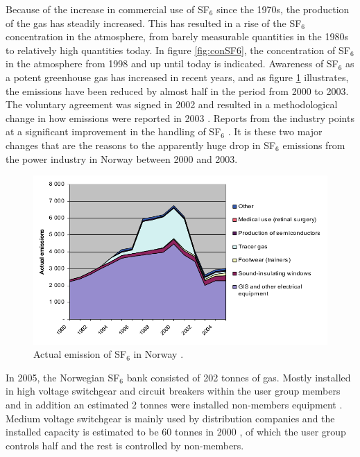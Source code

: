 \documentclass[10pt,a4paper,twoside]{article}
\begin{document}
Because of the increase in commercial use of SF$_6$ since the 1970s, the production of the gas has steadily increased. This has resulted in a rise of the SF$_6$ concentration in the atmosphere, from barely measurable quantities in the 1980s \cite{bib:SF6PI} to relatively high quantities today. In figure \ref{fig:conSF6}, the concentration of SF$_6$ in the atmosphere from 1998 and up until today is indicated. Awareness of SF$_6$ as a potent greenhouse gas has increased in recent years, and as figure \ref{fig:SF6EmissNor} illustrates, the emissions have been reduced by almost half in the period from 2000 to 2003. The voluntary agreement was signed in 2002 and resulted in a methodological change in how emissions were reported in 2003 \cite{bib:regSF6Miljo}. Reports from the industry points at a significant improvement in the handling of SF$_6$ \cite{bib:StatSF6}. It is these two major changes that are the reasons to the apparently huge drop in SF$_6$ emissions from the power industry in Norway between 2000 and 2003.

\begin{figure}[H]
\centering
\includegraphics[scale=0.5]{Bilder/Theory/emissionsSF6Norway.png}
\caption{Actual emission of SF$_6$ in Norway \cite{bib:StatSF6}.} \label{fig:SF6EmissNor}
\end{figure}

In 2005, the Norwegian SF$_6$ bank consisted of 202 tonnes of gas. Mostly installed in high voltage switchgear and circuit breakers within the user group members and in addition an estimated 2 tonnes were installed non-members equipment \cite{bib:StatSF6}. Medium voltage switchgear is mainly used by distribution companies and the installed capacity is estimated to be 60 tonnes in 2000 \cite{bib:StatSF6}, of which the user group controls half and the rest is controlled by non-members.
\end{document}
